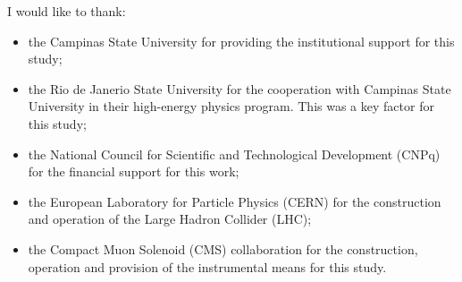 \documentclass[ 
11pt, %
english, %
onehalfspacing, %
nolistspacing, %
headsepline, %
chapterinoneline, %
]{MastersDoctoralThesis} %
\begin{document}
\begin{acknowledgements}
\addchaptertocentry{\acknowledgementname} %
I would like to thank:
\begin{itemize}
  \item the Campinas State University for providing the institutional support for this study;
  \item the Rio de Janerio State University for the cooperation with Campinas State University in their high-energy physics program. This was a key factor for this study;
  \item the National Council for Scientific and Technological Development (CNPq) for the financial support for this work;
  \item the European Laboratory for Particle Physics (CERN) for the construction and operation of the Large Hadron Collider (LHC);
  \item the Compact Muon Solenoid (CMS) collaboration for the construction, operation and provision of the instrumental means for this study.
\end{itemize}

\end{acknowledgements}


\tableofcontents %





%
%
\end{document}
